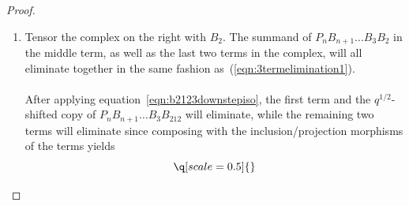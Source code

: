 \documentclass[11pt]{article}
\DeclareMathOperator{\id}{id}
\theoremstyle{definition}
\theoremstyle{remark}
\numberwithin{equation}{section}
\begin{document}
\begin{proof}
\begin{enumerate}[label=(\arabic*)]
\[{}-\frac{1}{\partial_2(\alpha_1)}
	\q[scale=0.2]{
		\qwire[color=orange] \qspace \qwire[color=blue,id=outwire]\n
		\qwire[color=orange] \qcapraw[frame color=blue,hlen=3]\n
		\qwire[color=orange] \qwire[color=blue]\qcounit[color=orange,
		frame color=orange, id=cou] \qwire[color=blue]
		\n
		\qwire[color=orange] \qunit[color=blue, frame color=blue, id=u2]
		\qwire[color=orange] \qwire[color=blue] \n
		\qcupraw[frame color=orange,hlen=3] \qwire[color=blue]
		\n
		\qspace \qwire[color=orange, id=midwire] \qspace \qwire[color=blue]\n
		\qcapraw[frame color=orange, hlen=3] \qwire[color=blue]\n
		\qwire[color=orange] \qcounit[color=blue, frame color=blue, id=cou2]
		\qwire[color=orange] \qwire[color=blue]
		\n
		\qwire[color=orange]
		\qwire[color=blue]
		\qunit[color=orange,frame color=orange, id=u]
		\qwire[color=blue]
		\n
		\qwire[color=orange] \qcupraw[frame color=blue, hlen=3]\n
		\qwire[color=orange] \qspace \qwire[color=blue,vlen=1.4]
\qwire[cod=S-outwire,vlen=0.4,color=blue]
\qwire[dom={C-u}, cod={N-u}, color=orange]
\qwire[dom={C-u2}, cod={N-u2}, color=blue]
\qwire[cod={C-cou}, dom={S-cou}, color=orange]
\qwire[cod={C-cou2}, dom={S-cou2}, color=blue]
\qwire[dom=N-midwire, color=orange, vlen=0.4]
\qwire[cod=S-midwire, color=orange, vlen=0.4]
}=\left(\partial_1(\alpha_2)-\frac{1}{\partial_2(\alpha_1)}\right)\id_{B_2B_1}
\]
and $\partial_1(\alpha_2)=2$ while
$\partial_2(\alpha_1)=1$, and so the entire three-term complex is
eliminated by $B_1$\footnote{The result continues to hold in the geometric
realization for type $\mathbb{B}_{n+1}$, as in that case,
$\partial_1(\alpha_2)=\frac{1}{\sqrt{2}}$,
which does not equal $\frac{1}{\partial_2(\alpha_1)}=\sqrt{2}$. One must
however note that the field we define our realization over can then no longer
be $\mathbb{Q}$.}.
\item  Tensor the complex on the right with $B_2$. The summand of
$P_nB_{n+1}\dots B_3B_2$  in the middle term, as well as the last two terms
in the complex, will all eliminate together in the same fashion
as~(\ref{eqn:3termelimination1}).
\\ \\
After applying equation~\ref{eqn:b2123downstepiso},
the first term and the $q^{1/2}$-shifted copy of 
$P_nB_{n+1}\dots B_3B_{212}$ will eliminate, while the remaining two terms will
eliminate since composing with the inclusion/projection morphisms of the terms
yields
\[
	\q[scale=0.5]{
	
}\]
\end{enumerate}
\end{proof}
\end{document}
